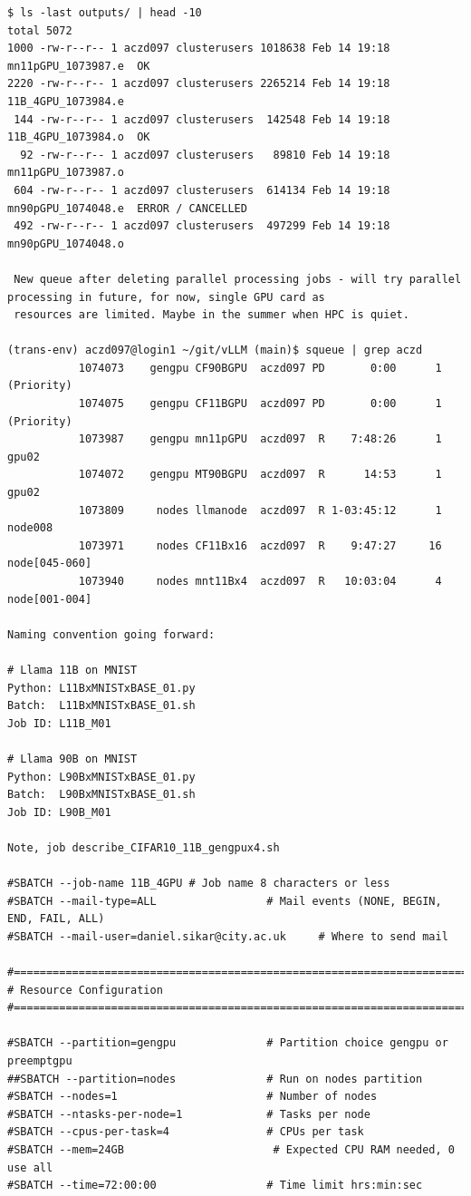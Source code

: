 \begin{verbatim}
$ ls -last outputs/ | head -10
total 5072
1000 -rw-r--r-- 1 aczd097 clusterusers 1018638 Feb 14 19:18 mn11pGPU_1073987.e  OK
2220 -rw-r--r-- 1 aczd097 clusterusers 2265214 Feb 14 19:18 11B_4GPU_1073984.e
 144 -rw-r--r-- 1 aczd097 clusterusers  142548 Feb 14 19:18 11B_4GPU_1073984.o  OK
  92 -rw-r--r-- 1 aczd097 clusterusers   89810 Feb 14 19:18 mn11pGPU_1073987.o
 604 -rw-r--r-- 1 aczd097 clusterusers  614134 Feb 14 19:18 mn90pGPU_1074048.e  ERROR / CANCELLED 
 492 -rw-r--r-- 1 aczd097 clusterusers  497299 Feb 14 19:18 mn90pGPU_1074048.o

 New queue after deleting parallel processing jobs - will try parallel processing in future, for now, single GPU card as 
 resources are limited. Maybe in the summer when HPC is quiet.

(trans-env) aczd097@login1 ~/git/vLLM (main)$ squeue | grep aczd
           1074073    gengpu CF90BGPU  aczd097 PD       0:00      1 (Priority)
           1074075    gengpu CF11BGPU  aczd097 PD       0:00      1 (Priority)
           1073987    gengpu mn11pGPU  aczd097  R    7:48:26      1 gpu02
           1074072    gengpu MT90BGPU  aczd097  R      14:53      1 gpu02
           1073809     nodes llmanode  aczd097  R 1-03:45:12      1 node008
           1073971     nodes CF11Bx16  aczd097  R    9:47:27     16 node[045-060]
           1073940     nodes mnt11Bx4  aczd097  R   10:03:04      4 node[001-004]

Naming convention going forward:

# Llama 11B on MNIST
Python: L11BxMNISTxBASE_01.py
Batch:  L11BxMNISTxBASE_01.sh
Job ID: L11B_M01

# Llama 90B on MNIST
Python: L90BxMNISTxBASE_01.py
Batch:  L90BxMNISTxBASE_01.sh
Job ID: L90B_M01

Note, job describe_CIFAR10_11B_gengpux4.sh

#SBATCH --job-name 11B_4GPU # Job name 8 characters or less
#SBATCH --mail-type=ALL                 # Mail events (NONE, BEGIN, END, FAIL, ALL)
#SBATCH --mail-user=daniel.sikar@city.ac.uk     # Where to send mail

#===============================================================================
# Resource Configuration
#===============================================================================

#SBATCH --partition=gengpu              # Partition choice gengpu or preemptgpu 
##SBATCH --partition=nodes              # Run on nodes partition
#SBATCH --nodes=1                       # Number of nodes
#SBATCH --ntasks-per-node=1             # Tasks per node
#SBATCH --cpus-per-task=4               # CPUs per task
#SBATCH --mem=24GB                       # Expected CPU RAM needed, 0 use all
#SBATCH --time=72:00:00                 # Time limit hrs:min:sec


\end{verbatim}
